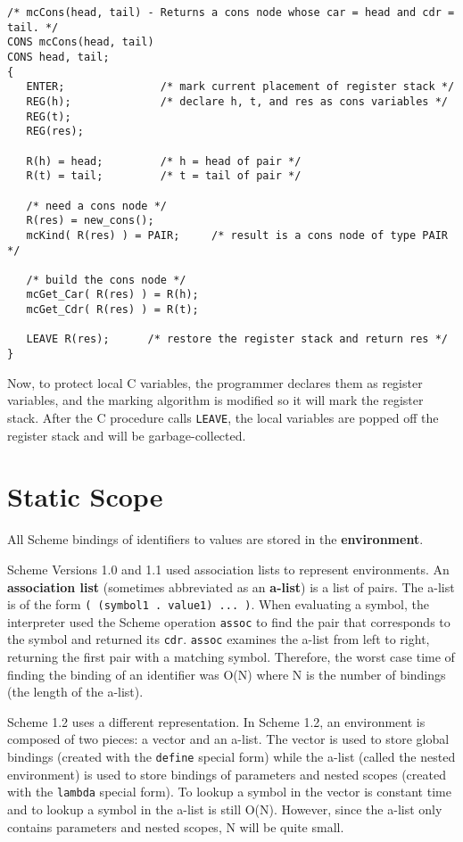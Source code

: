 \begin{verbatim}
/* mcCons(head, tail) - Returns a cons node whose car = head and cdr = tail. */
CONS mcCons(head, tail)
CONS head, tail;
{
   ENTER;               /* mark current placement of register stack */
   REG(h);              /* declare h, t, and res as cons variables */
   REG(t);
   REG(res);

   R(h) = head;         /* h = head of pair */
   R(t) = tail;         /* t = tail of pair */

   /* need a cons node */
   R(res) = new_cons();
   mcKind( R(res) ) = PAIR;     /* result is a cons node of type PAIR */

   /* build the cons node */
   mcGet_Car( R(res) ) = R(h);
   mcGet_Cdr( R(res) ) = R(t);

   LEAVE R(res);      /* restore the register stack and return res */
}
\end{verbatim}

	Now, to protect local C variables, the programmer declares them
as register variables, and the marking algorithm is modified so it will
mark the register stack.  After the C procedure calls {\tt LEAVE}, the
local variables are popped off the register stack and will be
garbage-collected.

\section{Static Scope}

	All Scheme bindings of identifiers to values are stored in the
{\bf environment}.

	Scheme Versions 1.0 and 1.1 used association lists to represent
environments.  An {\bf association list} (sometimes abbreviated as an {\bf
a-list}) is a list of pairs.  The a-list is of the form {\tt ( (symbol1 .
value1) ... )}.  When evaluating a symbol, the interpreter used the Scheme
operation {\tt assoc} to find the pair that corresponds to the symbol and
returned its {\tt cdr}.  {\tt assoc} examines the a-list from left to
right, returning the first pair with a matching symbol.  Therefore, the
worst case time of finding the binding of an identifier was O(N) where N
is the number of bindings (the length of the a-list).

	Scheme 1.2 uses a different representation.  In Scheme 1.2, an
environment is composed of two pieces: a vector and an a-list.  The vector
is used to store global bindings (created with the {\tt define} special
form) while the a-list (called the nested environment) is used to store
bindings of parameters and nested scopes (created with the {\tt lambda}
special form).  To lookup a symbol in the vector is constant time and to
lookup a symbol in the a-list is still O(N).  However, since the a-list
only contains parameters and nested scopes, N will be quite small.

